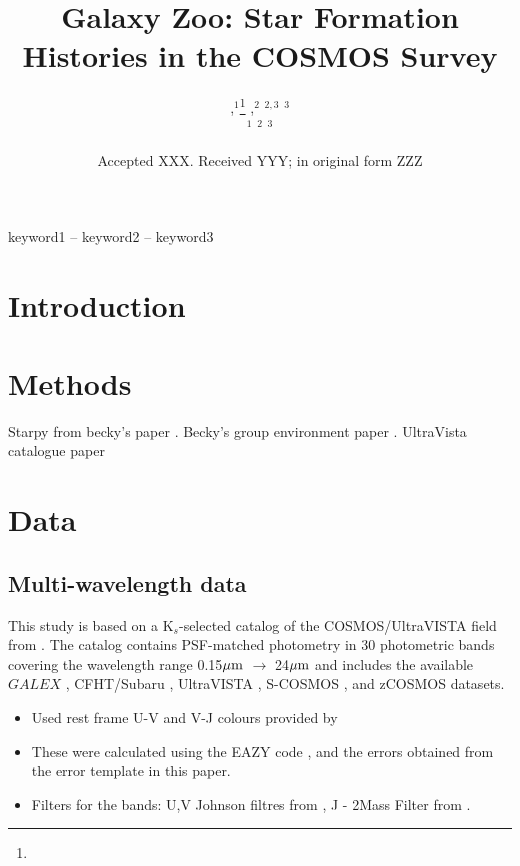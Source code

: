 \documentclass[a4paper,fleqn,usenatbib]{mnras}
\title[COSMOS SFHs]{Galaxy Zoo: Star Formation Histories in the COSMOS Survey}
\author[]{
,$^{1}$\thanks{}
,$^{2}$
$^{2,3}$
$^{3}$
\\
$^{1}$
$^{2}$
$^{3}$
}
\date{Accepted XXX. Received YYY; in original form ZZZ}
\begin{document}
\label{firstpage}
\pagerange{\pageref{firstpage}--\pageref{lastpage}}
\maketitle

\begin{abstract}


\end{abstract}

\begin{keywords}
keyword1 -- keyword2 -- keyword3
\end{keywords}



\section{Introduction}

\section{Methods}

Starpy from becky's paper \cite{smethurst2015galaxy}.
Becky's group environment paper \cite{smethurst2017galaxy}.
UltraVista catalogue paper \cite{muzzin2013public}
\section{Data}
   
   \subsection{Multi-wavelength data}
   
   This study is based on a K$_{s}$-selected catalog of the COSMOS/UltraVISTA field from \cite{muzzin2013public}.  
   The catalog contains PSF-matched photometry in 30 photometric bands covering the wavelength range 0.15$\hbox{$\mu$m}$ 
   $\rightarrow$ 24$\hbox{$\mu$m}$ and includes the available $GALEX$ \citep{martin2005}, CFHT/Subaru \citep{capak2007}, 
   UltraVISTA \citep{mcCraken2012}, S-COSMOS \citep{sanders2007}, and zCOSMOS \citep{lilly2009} datasets.

   \begin{itemize}
   
   \item Used rest frame U-V and V-J colours provided by \cite{muzzin2013public}
   \item These were calculated using the \textsc{EAZY} code \cite{eazycode}, and the errors obtained from the error template in this paper.
   \item Filters for the bands: U,V Johnson filtres from \cite{maiz2006}, J - 2Mass Filter from \cite{2mass2006}.
   \end{itemize}
\end{document}
